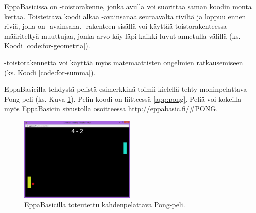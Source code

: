
EppaBasicissa on
-toistorakenne, jonka
avulla voi suorittaa saman
koodin monta kertaa.
Toistettava koodi alkaa
-avainsanaa seuraavalta
riviltä ja loppuu ennen riviä,
jolla on -avainsana.
-rakenteen sisällä voi
käyttää toistorakenteessa määriteltyä
muuttujaa, jonka arvo käy läpi
kaikki luvut annetulla välillä
(ks. Koodi \ref{code:for-geometria}).


-toistorakennetta voi
käyttää myös matemaattisten 
ongelmien ratkausemiseen
(ks. Koodi \ref{code:for-summa}).


EppaBasicilla tehdystä pelistä
esimerkkinä toimii
kielellä tehty moninpelattava
Pong-peli
(ks. Kuva \ref{img:pong}).
Pelin koodi on liitteessä \ref{app:pong}.
Peliä voi kokeilla myös
EppaBasicin sivustolla osoitteessa
\url{http://eppabasic.fi/#PONG}.

\begin{figure}[h]
    \centering
    \includegraphics[width=0.5\textwidth]{pong}
    \caption{EppaBasicilla toteutettu kahdenpelattava Pong-peli.}
    \label{img:pong}
\end{figure}